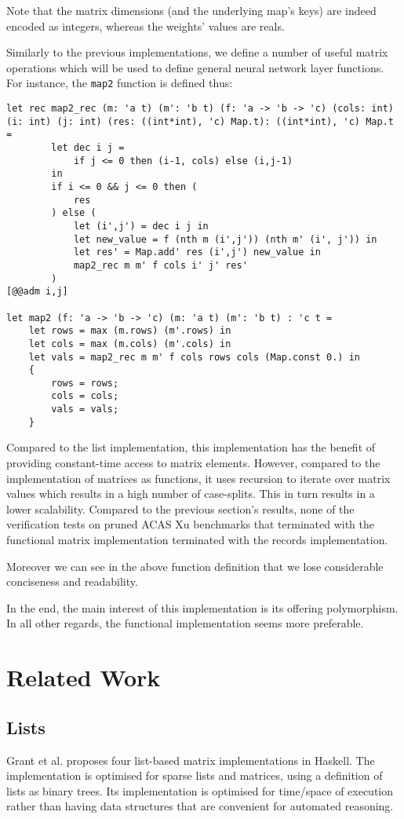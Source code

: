 \documentclass[runningheads]{llncs}
\begin{document}
Note that the matrix dimensions (and the underlying map's keys) are indeed encoded as integers, whereas the weights' values are reals. 

Similarly to the previous implementations, we define a number of useful matrix operations which will be used to define general neural network layer functions. For instance, the \lstinline{map2} function is defined thus:

\begin{lstlisting}[language=caml, label={lst:map2_records}]
let rec map2_rec (m: 'a t) (m': 'b t) (f: 'a -> 'b -> 'c) (cols: int) (i: int) (j: int) (res: ((int*int), 'c) Map.t): ((int*int), 'c) Map.t =
		let dec i j = 
			if j <= 0 then (i-1, cols) else (i,j-1)     
		in
		if i <= 0 && j <= 0 then (
			res
		) else (
			let (i',j') = dec i j in
			let new_value = f (nth m (i',j')) (nth m' (i', j')) in
			let res' = Map.add' res (i',j') new_value in
			map2_rec m m' f cols i' j' res'
		)
[@@adm i,j]

let map2 (f: 'a -> 'b -> 'c) (m: 'a t) (m': 'b t) : 'c t = 
	let rows = max (m.rows) (m'.rows) in
	let cols = max (m.cols) (m'.cols) in
	let vals = map2_rec m m' f cols rows cols (Map.const 0.) in
	{
		rows = rows;
		cols = cols;
		vals = vals;
	}
\end{lstlisting} 

Compared to the list implementation, this implementation has the benefit of providing constant-time access to matrix elements. However, compared to the implementation of matrices as functions, it uses recursion to iterate over matrix values which results in a high number of case-splits. This in turn results in a lower scalability.
Compared to the previous section's results, none of the verification tests on pruned ACAS Xu benchmarks that terminated with the functional matrix implementation terminated with the records implementation.

Moreover we can see in the above function definition that we lose considerable conciseness and readability.

In the end, the main interest of this implementation is its offering polymorphism. In all other regards, the functional implementation seems more preferable.

\iffalse
\section{Related Work}
\subsection{Lists}
Grant et al. \cite{grant_sparse_1996} proposes four list-based matrix implementations in Haskell. The implementation is optimised for sparse lists and matrices, using a definition of lists as binary trees. Its implementation is optimised for time/space of execution rather than having data structures that are convenient for automated reasoning.
\end{document}
